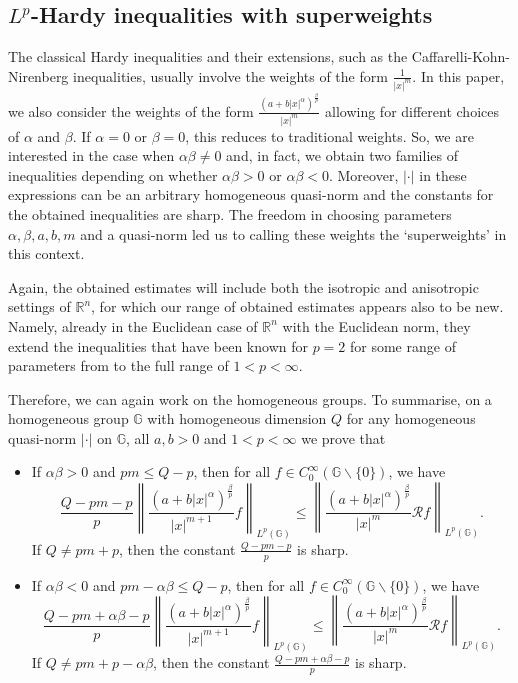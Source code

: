 \documentclass[a4paper,12pt,reqno]{amsart}
\numberwithin{equation}{section}
\theoremstyle{plain}
\theoremstyle{definition}
\begin{document}
\subsection{$L^p$-Hardy inequalities with superweights}

The classical Hardy inequalities and their extensions, such as the Caffarelli-Kohn-Nirenberg inequalities, usually involve the weights of the form $\frac{1}{|x|^{m}}$. In this paper, we also consider the weights of the form $\frac{(a+b|x|^{\alpha})^{\frac{\beta}{p}}}{|x|^{m}}$ allowing for different choices of $\alpha$ and $\beta$. If $\alpha=0$ or $\beta=0$, this reduces to traditional weights. So, we are interested in the case when $\alpha\beta\not=0$ and, in fact, we obtain two families of inequalities depending on whether $\alpha\beta>0$ or $\alpha\beta<0$. Moreover, $|\cdot|$ in these expressions can be an arbitrary homogeneous quasi-norm and the constants for the obtained inequalities are sharp. The freedom in choosing parameters $\alpha,\beta, a,b,m$ and a quasi-norm led us to calling these weights the `superweights' in this context.

Again, the obtained estimates will include both the isotropic and anisotropic settings of $\mathbb R^{n}$, for which our range of obtained estimates appears also to be new. Namely, already in the Euclidean case of $\mathbb R^{n}$ with the Euclidean norm, they extend the inequalities that have been known for $p=2$ for some range of parameters from \cite{GM11} to the full range of $1<p<\infty$.

Therefore, we can again work on the homogeneous groups.
To summarise, on a homogeneous group $\mathbb{G}$
with homogeneous dimension $Q$ for any homogeneous quasi-norm $|\cdot|$ on $\mathbb{G}$, all $a,b>0$ and $1<p<\infty$ we prove that
\begin{itemize}
\item If $\alpha \beta>0$ and $pm\leq Q-p$, then for all $f\in C_{0}^{\infty}(\mathbb{G}\backslash\{0\})$, we have
\begin{equation}\label{intro1} \frac{Q-pm-p}{p}
\left\|\frac{(a+b|x|^{\alpha})^{\frac{\beta}{p}}}{|x|^{m+1}}f\right\|_{L^{p}(\mathbb{G})}
\leq\left\|\frac{(a+b|x|^{\alpha})^{\frac{\beta}{p}}}{|x|^{m}}\mathcal{R}f\right\|_{L^{p}(\mathbb{G})} .
\end{equation}
If $Q\neq pm+p$, then the constant $\frac{Q-pm-p}{p}$ is sharp.

\item If $\alpha \beta<0$ and $pm-\alpha\beta\leq Q-p$, then for all $f\in C_{0}^{\infty}(\mathbb{G}\backslash\{0\})$, we have
\begin{equation} \label{intro2}
\frac{Q-pm+\alpha\beta-p}{p}
\left\|\frac{(a+b|x|^{\alpha})^{\frac{\beta}{p}}}{|x|^{m+1}}f\right\|_{L^{p}(\mathbb{G})}
\leq\left\|\frac{(a+b|x|^{\alpha})^{\frac{\beta}{p}}}{|x|^{m}}\mathcal{R}f\right\|_{L^{p}(\mathbb{G})}
.
\end{equation}
If $Q\neq pm+p-\alpha\beta$, then the constant $\frac{Q-pm+\alpha\beta-p}{p}$ is sharp.
\end{itemize}
\end{document}
